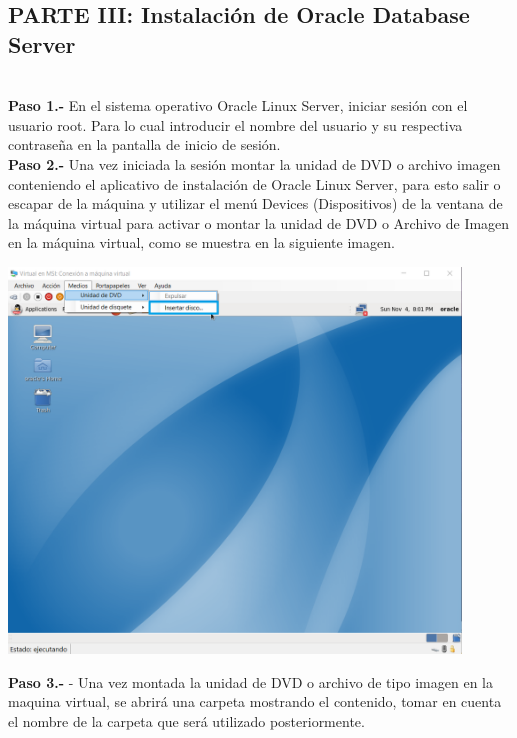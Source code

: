 \begin{enumerate}
\subsection{PARTE III: Instalación de Oracle Database Server}
\vspace{12pt}\\

\textbf {Paso 1.-} En el sistema operativo Oracle Linux Server, iniciar sesión con el usuario root. Para lo cual introducir el nombre del usuario y su respectiva contraseña en la pantalla de inicio de sesión.
\vspace{12pt}\\

\textbf {Paso 2.-} Una vez iniciada la sesión montar la unidad de DVD o archivo imagen conteniendo el aplicativo de instalación de Oracle Linux Server, para esto salir o escapar de la máquina y utilizar el menú Devices (Dispositivos) de la ventana de la máquina virtual para activar o montar la unidad de DVD o Archivo de Imagen en la máquina virtual, como se muestra en la siguiente imagen.
\begin{center}
  \includegraphics[width=12cm]{Imagenes/Oracle_Database/2_Insertar_Disco.png}
\end{center}
\break

\textbf {Paso 3.-} - Una vez montada la unidad de DVD o archivo de tipo imagen en la maquina virtual, se abrirá una carpeta mostrando el contenido, tomar en cuenta el nombre de la carpeta que será utilizado posteriormente.
\vspace{12pt}\\


\end{enumerate}
